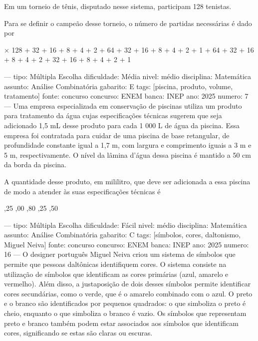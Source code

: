 Em um torneio de tênis, disputado nesse sistema, participam 128 tenistas.

Para se definir o campeão desse torneio, o número de partidas necessárias é dado por
\begin{oneparchoices}
 × 128
 + 32 + 16 + 8 + 4 + 2
 + 64 + 32 + 16 + 8 + 4 + 2 + 1
 + 64 + 32 + 16 + 8 + 4 + 2
 + 32 + 16 + 8 + 4 + 2 + 1
\end{oneparchoices}

---
tipo: Múltipla Escolha
dificuldade: Média
nivel: médio
disciplina: Matemática
assunto: Análise Combinatória
gabarito: E
tags: [piscina, produto, volume, tratamento]
fonte: concurso
concurso: ENEM
banca: INEP
ano: 2025
numero: 7
---
\question
Uma empresa especializada em conservação de piscinas utiliza um produto para tratamento da água cujas especificações técnicas sugerem que seja adicionado 1,5 mL desse produto para cada 1 000 L de água da piscina. Essa empresa foi contratada para cuidar de uma piscina de base retangular, de profundidade constante igual a 1,7 m, com largura e comprimento iguais a 3 m e 5 m, respectivamente. O nível da lâmina d’água dessa piscina é mantido a 50 cm da borda da piscina.

A quantidade desse produto, em mililitro, que deve ser adicionada a essa piscina de modo a atender às suas especificações técnicas é
\begin{oneparchoices}
,25
,00
,80
,25
,50
\end{oneparchoices}

---
tipo: Múltipla Escolha
dificuldade: Fácil
nivel: médio
disciplina: Matemática
assunto: Análise Combinatória
gabarito: C
tags: [símbolos, cores, daltonismo, Miguel Neiva]
fonte: concurso
concurso: ENEM
banca: INEP
ano: 2025
numero: 16
---
\question
O designer português Miguel Neiva criou um sistema de símbolos que permite que pessoas daltônicas identifiquem cores. O sistema consiste na utilização de símbolos que identificam as cores primárias (azul, amarelo e vermelho). Além disso, a justaposição de dois desses símbolos permite identificar cores secundárias, como o verde, que é o amarelo combinado com o azul. O preto e o branco são identificados por pequenos quadrados: o que simboliza o preto é cheio, enquanto o que simboliza o branco é vazio. Os símbolos que representam preto e branco também podem estar associados aos símbolos que identificam cores, significando se estas são claras ou escuras.

